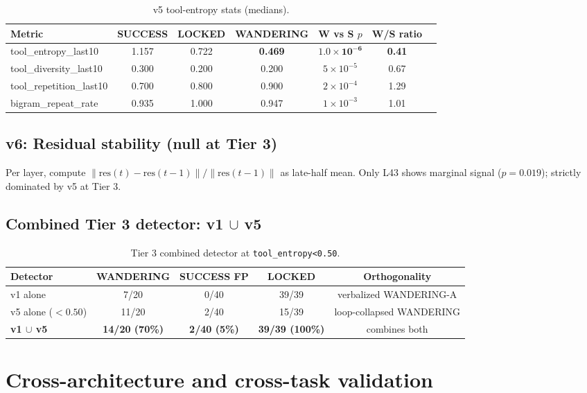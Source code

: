 \documentclass[11pt]{article}
\begin{document}
\begin{table}[h]
\centering
\caption{v5 tool-entropy stats (medians).}
\begin{tabular}{lcccccc}
\toprule
Metric & SUCCESS & LOCKED & WANDERING & W vs S $p$ & W/S ratio \\
\midrule
tool\_entropy\_last10 & 1.157 & 0.722 & \textbf{0.469} & $\mathbf{1.0\times10^{-6}}$ & \textbf{0.41} \\
tool\_diversity\_last10 & 0.300 & 0.200 & 0.200 & $5\times10^{-5}$ & 0.67 \\
tool\_repetition\_last10 & 0.700 & 0.800 & 0.900 & $2\times10^{-4}$ & 1.29 \\
bigram\_repeat\_rate & 0.935 & 1.000 & 0.947 & $1\times10^{-3}$ & 1.01 \\
\bottomrule
\end{tabular}
\end{table}

\subsection{v6: Residual stability (null at Tier 3)}
Per layer, compute $\|\text{res}(t) - \text{res}(t-1)\| / \|\text{res}(t-1)\|$ as late-half mean. Only L43 shows marginal signal ($p = 0.019$); strictly dominated by v5 at Tier 3.

\subsection{Combined Tier 3 detector: v1 $\cup$ v5}
\begin{table}[h]
\centering
\caption{Tier 3 combined detector at \texttt{tool\_entropy<0.50}.}
\begin{tabular}{lcccc}
\toprule
Detector & WANDERING & SUCCESS FP & LOCKED & Orthogonality \\
\midrule
v1 alone & 7/20 & 0/40 & 39/39 & verbalized WANDERING-A \\
v5 alone ($<0.50$) & 11/20 & 2/40 & 15/39 & loop-collapsed WANDERING \\
\textbf{v1 $\cup$ v5} & \textbf{14/20 (70\%)} & \textbf{2/40 (5\%)} & \textbf{39/39 (100\%)} & combines both \\
\bottomrule
\end{tabular}
\end{table}

\section{Cross-architecture and cross-task validation}\label{sec:cross-arch}
\end{document}

